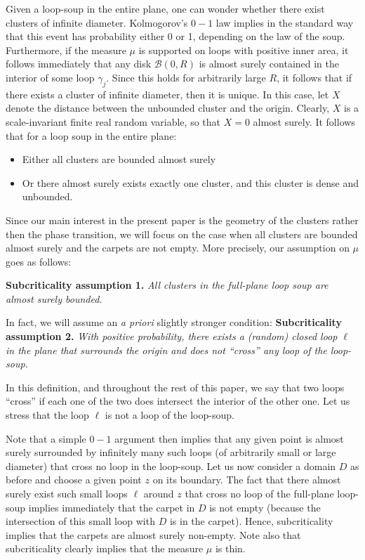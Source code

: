\documentclass[11pt]{article}
\newcommand{\B}{{\mathcal B}}
\begin{document}
Given a loop-soup in the entire plane, one can wonder whether there exist 
clusters of infinite diameter. Kolmogorov's $0-1$ law implies in the standard way 
that this event has probability either 0 or 1, depending on the law of the soup.
Furthermore, if the measure $\mu$ is supported on loops with positive inner area,
it follows immediately that any disk $\B(0,R)$ is almost surely
contained in the interior of some loop $\gamma_j$.
Since this holds for arbitrarily large $R$, it follows that if there exists 
a cluster of infinite diameter, then it is unique. 
In this case, let $X$ denote the distance between the unbounded cluster and the origin. 
Clearly, $X$ is a scale-invariant finite real random variable, so that $X=0$ almost surely. 
It follows that for a loop soup in the entire plane:
\begin {itemize}
\item Either all clusters are bounded almost surely
\item Or there almost surely exists exactly one cluster, and this cluster is dense and unbounded.
\end {itemize}


Since our main interest in the present paper is the geometry of the clusters rather 
then the phase transition,
we will focus on the case when all clusters are bounded almost surely 
and the carpets are not empty. 
More precisely, our assumption on $\mu$ goes as follows:
 
\medbreak
\noindent
{\bf Subcriticality assumption 1.}
{\sl All clusters in the full-plane loop soup are almost surely bounded.}

\medbreak
In fact, we will assume an {\it a priori} slightly stronger condition:
\medbreak
\noindent
{\bf Subcriticality assumption 2.}
{\sl 
With positive probability, there exists a (random) closed loop $\ell$ in the plane 
that surrounds the origin and does not ``cross'' any loop of the loop-soup.}

\medbreak
In this definition, and throughout the rest of this paper, we say that two loops ``cross'' if each one of the two does intersect the interior of the other one.
Let us stress that the loop $\ell$ is not a loop of the loop-soup.
\medbreak

Note that a simple $0-1$ argument then implies that any given point is almost surely surrounded by infinitely many such loops (of arbitrarily small or large diameter) that cross no loop in the loop-soup. Let us now consider a domain $D$ as before and choose a given point $z$ on its boundary. The fact that there almost surely exist such small loops $\ell$ around $z$ that cross no loop of the full-plane loop-soup implies immediately that the carpet in $D$ is not empty (because the intersection of this small loop with $D$ is in the carpet). Hence, subcriticality implies that the carpets are almost surely non-empty. Note also that subcriticality clearly implies that the measure $\mu$ is thin. 
\end{document}
